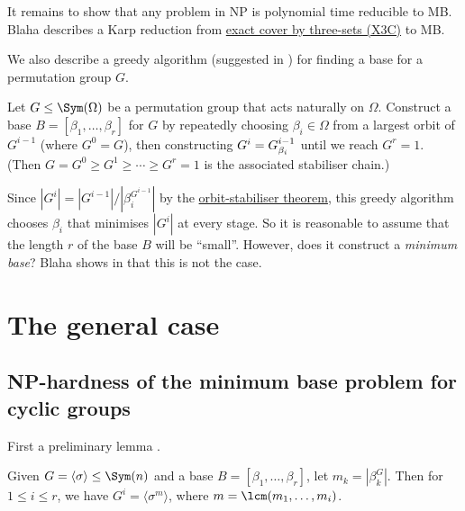 It remains to show that any problem in NP is polynomial time reducible to MB. Blaha describes a Karp reduction from \hyperref[eg:X3C]{exact cover by three-sets (X3C)} to MB. 

We also describe a greedy algorithm (suggested in \cite{brown1989}) for finding a base for a permutation group $G$. 

\begin{algorithm}\label{alg:blaha_greedy_base}
    Let $G \leq \Sym(\Omega)$ be a permutation group that acts naturally on $\Omega$. Construct a base $B = [\beta_1,\dotsc,\beta_r]$ for $G$ by repeatedly choosing $\beta_i \in \Omega$ from a largest orbit of $G^{i-1}$ (where $G^0 = G$), then constructing $G^i = \added{2}{G^{i-1}_{\beta_i}}$ until we reach $G^r = 1$. (Then $G = G^0 \geq G^1 \geq \dotsb \geq G^r = 1$ is the associated stabiliser chain.)
\end{algorithm}

Since $|G^i| = |G^{i-1}|/|\beta_i^{G^{i-1}}|$ by the \hyperref[thm:orbit_stabiliser]{orbit-stabiliser theorem}, this greedy algorithm chooses $\beta_i$ that minimises $|G^i|$ at every stage. So it is reasonable to assume that the length $r$ of the base $B$ will be ``small''. However, does it construct a \textit{minimum base}? Blaha shows in \cite{blaha1992} that this is not the case.


\section{The general case}

\subsection{NP-hardness of the minimum base problem for cyclic groups}

First a preliminary lemma .

\begin{lemma}\label{lem:blaha_cyclic_stabiliser}
    Given $G = \langle \sigma \rangle \leq \Sym(n)$ and a base $B = [\beta_1,\dotsc,\beta_r]$, let $m_k = |\beta_k^G|$. Then for $1 \leq i \leq r$, we have $G^i = \langle \sigma^m \rangle$, where $m = \lcm(m_1,\dotsc,m_i)$.
\end{lemma}

